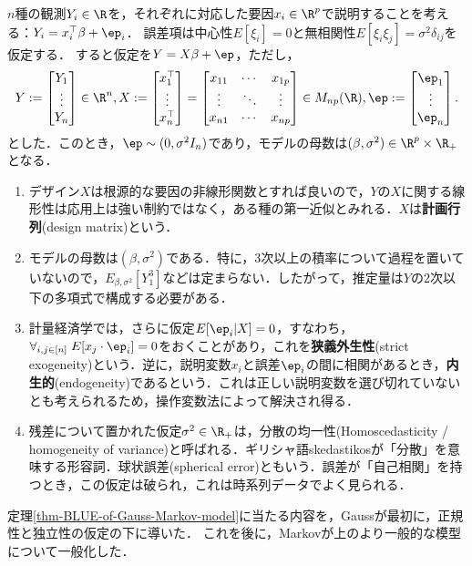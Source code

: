 \documentclass[uplatex,dvipdfmx]{jsreport}
\begin{document}
\begin{model}
    $n$種の観測$Y_i\in\R$を，それぞれに対応した要因$x_i\in\R^p$で説明することを考える：$Y_i=x_i^\top\beta+\ep_i$．
    誤差項は中心性$E[\xi_i]=0$と無相関性$E[\xi_i\xi_j]=\sigma^2\delta_{ij}$を仮定する．
    すると仮定を$Y=X\beta+\ep$，ただし，
    \[Y:= \begin{bmatrix}Y_1\\\vdots\\Y_n\end{bmatrix}\in\R^n,X:=\begin{bmatrix}x^\top_1\\\vdots\\x^\top_n\end{bmatrix}=\begin{bmatrix}x_{11}&\cdots&x_{1p}\\\vdots&\ddots&\vdots\\x_{n1}&\cdots&x_{np}\end{bmatrix}\in M_{np}(\R),\ep:=\begin{bmatrix}\ep_1\\\vdots\\\ep_n\end{bmatrix}.\]
    とした．このとき，$\ep\sim(0,\sigma^2I_n)$であり，モデルの母数は$(\beta,\sigma^2)\in\R^p\times\R_+$となる．
\end{model}
\begin{remarks}\mbox{}
    \begin{enumerate}
        \item デザイン$X$は根源的な要因の非線形関数とすれば良いので，$Y$の$X$に関する線形性は応用上は強い制約ではなく，ある種の第一近似とみれる．$X$は\textbf{計画行列}(design matrix)という．
        \item モデルの母数は$(\beta,\sigma^2)$である．特に，3次以上の積率について過程を置いていないので，$E_{\beta,\sigma^2}[Y_1^3]$などは定まらない．したがって，推定量は$Y$の2次以下の多項式で構成する必要がある．
        \item 計量経済学では，さらに仮定$E[\ep_i|X]=0$，すなわち，$\forall_{i,j\in[n]}\;E[x_j\cdot \ep_i]=0$をおくことがあり，これを\textbf{狭義外生性}(strict exogeneity)という．逆に，説明変数$x_i$と誤差$\ep_i$の間に相関があるとき，\textbf{内生的}(endogeneity)であるという．これは正しい説明変数を選び切れていないとも考えられるため，操作変数法によって解決され得る．
        \item 残差について置かれた仮定$\sigma^2\in\R_+$は，分散の均一性(Homoscedasticity / homogeneity of variance)と呼ばれる．ギリシャ語skedastikosが「分散」を意味する形容詞．球状誤差(spherical error)ともいう．誤差が「自己相関」を持つとき，この仮定は破られ，これは時系列データでよく見られる．
    \end{enumerate}
\end{remarks}
\begin{history}
    定理\ref{thm-BLUE-of-Gauss-Markov-model}に当たる内容を，Gaussが最初に，正規性と独立性の仮定の下に導いた．
    これを後に，Markovが上のより一般的な模型について一般化した．
\end{history}
\end{document}
